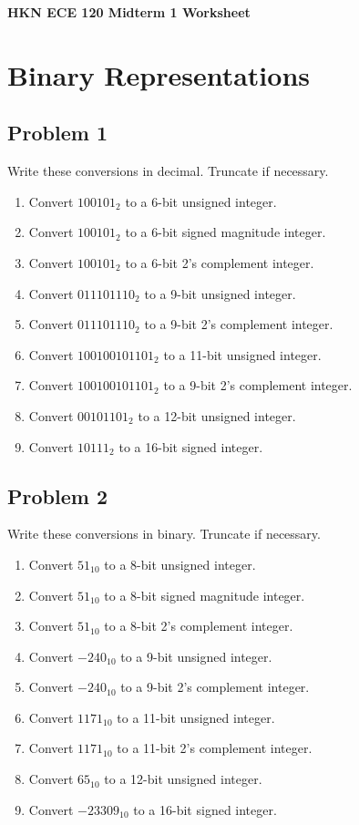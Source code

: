\documentclass{article}
\begin{document}
\begin{center}
\textbf{
{\Large HKN ECE 120 Midterm 1 Worksheet}
}
\end{center} 
\noindent\makebox[\linewidth]{\rule{\linewidth}{0.2pt}}


\section*{Binary Representations}
\subsection*{Problem 1}
Write these conversions in decimal. Truncate if necessary.
\begin{enumerate}[label=\alph*.]
    \item Convert $100101_2$ to a 6-bit unsigned integer.
    \item Convert $100101_2$ to a 6-bit signed magnitude integer.
    \item Convert $100101_2$ to a 6-bit 2's complement integer.
    \item Convert $0 1110 1110_2$ to a 9-bit unsigned integer.
    \item Convert $0 1110 1110_2$ to a 9-bit 2's complement integer.
    \item Convert $1001 0010 1101_2$ to a 11-bit unsigned integer.
    \item Convert $1001 0010 1101_2$ to a 9-bit 2's complement integer.
    \item Convert $0010 1101_2$ to a 12-bit unsigned integer.
    \item Convert $10111_2$ to a 16-bit signed integer. 
\end{enumerate}

\subsection*{Problem 2}
Write these conversions in binary. Truncate if necessary.
\begin{enumerate}[label=\alph*.]
    \item Convert $51_{10}$ to a 8-bit unsigned integer.
    \item Convert $51_{10}$ to a 8-bit signed magnitude integer.
    \item Convert $51_{10}$ to a 8-bit 2's complement integer.
    \item Convert $-240_{10}$ to a 9-bit unsigned integer.
    \item Convert $-240_{10}$ to a 9-bit 2's complement integer.
    \item Convert $1171_{10}$ to a 11-bit unsigned integer.
    \item Convert $1171_{10}$ to a 11-bit 2's complement integer.
    \item Convert $65_{10}$ to a 12-bit unsigned integer.
    \item Convert $-23309_{10}$ to a 16-bit signed integer. 
\end{enumerate}
\end{document}
